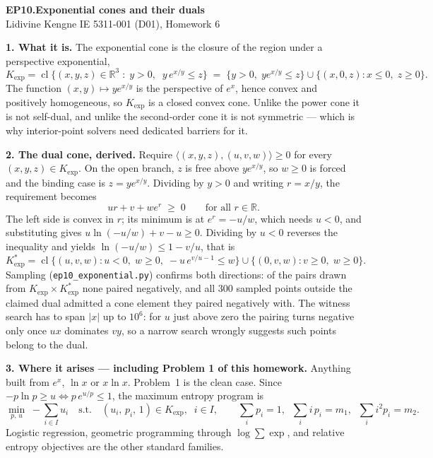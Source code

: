 \documentclass[10pt]{article}
\begin{document}
{\large\bfseries EP10.\quad Exponential cones and their duals}\\[1pt]
{\small Lidivine Kengne \quad\textbar\quad IE 5311-001 (D01), Homework 6}
\vspace{0.3em}

\textbf{1. What it is.}
The exponential cone is the closure of the region under a perspective
exponential,
\[
  K_{\exp} = \operatorname{cl}
  \bigl\{ (x,y,z) \in \mathbb{R}^3 \;:\; y > 0, \;\;
    y\,e^{x/y} \le z \bigr\}
  \;=\;
  \bigl\{ y > 0,\; y e^{x/y} \le z \bigr\}
  \cup
  \bigl\{ (x,0,z) : x \le 0,\; z \ge 0 \bigr\}.
\]
The function $(x,y) \mapsto y e^{x/y}$ is the perspective of $e^{x}$,
hence convex and positively homogeneous, so $K_{\exp}$ is a closed
convex cone. Unlike the power cone it is not self-dual, and unlike the
second-order cone it is not symmetric --- which is why interior-point
solvers need dedicated barriers for it.

\textbf{2. The dual cone, derived.}
Require $\langle (x,y,z),(u,v,w)\rangle \ge 0$ for every
$(x,y,z) \in K_{\exp}$. On the open branch, $z$ is free above
$y e^{x/y}$, so $w \ge 0$ is forced and the binding case is
$z = y e^{x/y}$. Dividing by $y > 0$ and writing $r = x/y$, the
requirement becomes
\[
  u r + v + w e^{r} \;\ge\; 0 \qquad\text{for all } r \in \mathbb{R}.
\]
The left side is convex in $r$; its minimum is at $e^{r} = -u/w$, which
needs $u < 0$, and substituting gives $u\ln(-u/w) + v - u \ge 0$.
Dividing by $u < 0$ reverses the inequality and yields
$\ln(-u/w) \le 1 - v/u$, that is
\[
  K_{\exp}^{*} = \operatorname{cl}\bigl\{ (u,v,w) :
    u < 0, \; w \ge 0, \; -u\,e^{v/u - 1} \le w \bigr\}
  \cup \bigl\{ (0,v,w) : v \ge 0,\; w \ge 0 \bigr\}.
\]
Sampling (\texttt{ep10\_exponential.py}) confirms both directions: of
the pairs drawn from $K_{\exp} \times K^*_{\exp}$ none paired
negatively, and all $300$ sampled points outside the claimed dual
admitted a cone element they paired negatively with. The witness search
has to span $|x|$ up to $10^{6}$: for $u$ just above zero the pairing
turns negative only once $ux$ dominates $vy$, so a narrow search
wrongly suggests such points belong to the dual.

\textbf{3. Where it arises --- including Problem 1 of this homework.}
Anything built from $e^{x}$, $\ln x$ or $x \ln x$. Problem~1 is the
clean case. Since $-p\ln p \ge u \iff p\,e^{u/p} \le 1$, the maximum
entropy program is
\[
  \min_{p,\,u}\; -\sum_{i \in I} u_i
  \quad\text{s.t.}\quad
  (u_i,\, p_i,\, 1) \in K_{\exp},\;\; i \in I,
  \qquad
  \sum_i p_i = 1, \;\; \sum_i i\,p_i = m_1, \;\; \sum_i i^2 p_i = m_2 .
\]
Logistic regression, geometric programming through $\log\sum\exp$, and
relative entropy objectives are the other standard families.
\end{document}
